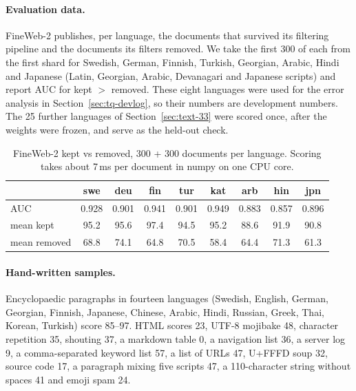 \paragraph{Evaluation data.} FineWeb-2 publishes, per language, the documents
that survived its filtering pipeline and the documents its filters removed.
We take the first 300 of each from the first shard for Swedish, German,
Finnish, Turkish, Georgian, Arabic, Hindi and Japanese (Latin, Georgian,
Arabic, Devanagari and Japanese scripts) and report AUC for kept $>$ removed.
These eight languages were used for the error analysis in
Section~\ref{sec:tq-devlog}, so their numbers are development numbers. The 25
further languages of Section~\ref{sec:text-33} were scored once, after the
weights were frozen, and serve as the held-out check.

\begin{table}[h]\centering
\begin{tabular}{lcccccccc}\toprule
 & swe & deu & fin & tur & kat & arb & hin & jpn \\\midrule
AUC & 0.928 & 0.901 & 0.941 & 0.901 & 0.949 & 0.883 & 0.857 & 0.896 \\
mean kept & 95.2 & 95.6 & 97.4 & 94.5 & 95.2 & 88.6 & 91.9 & 90.8 \\
mean removed & 68.8 & 74.1 & 64.8 & 70.5 & 58.4 & 64.4 & 71.3 & 61.3 \\
\bottomrule\end{tabular}
\caption{FineWeb-2 kept vs removed, 300 + 300 documents per language. Scoring takes about 7\,ms per document in numpy on one CPU core.}
\end{table}

\paragraph{Hand-written samples.} Encyclopaedic paragraphs in fourteen
languages (Swedish, English, German, Georgian, Finnish, Japanese, Chinese,
Arabic, Hindi, Russian, Greek, Thai, Korean, Turkish) score 85--97. HTML scores
23, UTF-8 mojibake 48, character repetition 35, shouting 37, a markdown table
0, a navigation list 36, a server log 9, a comma-separated keyword list 57, a
list of URLs 47, U+FFFD soup 32, source code 17, a paragraph mixing five
scripts 47, a 110-character string without spaces 41 and emoji spam 24.

